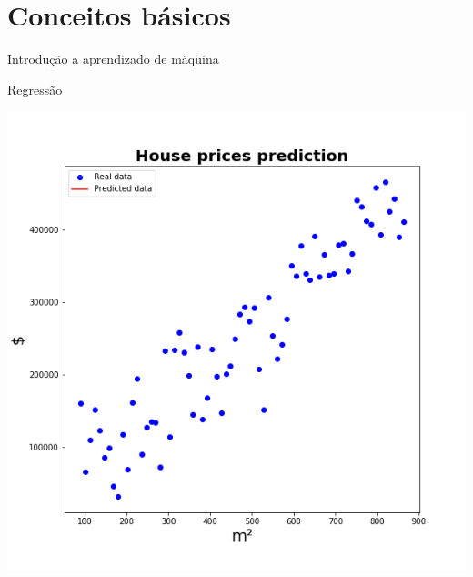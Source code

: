 \documentclass[10pt]{beamer}
\begin{document}
\nocite{DeepLearningbook}
\maketitle

\section{Conceitos básicos}

\begin{frame}{Introdução a aprendizado de máquina}

\end{frame}

\begin{frame}{Regressão}
\begin{center}
\includegraphics[scale=0.40]{images/house_prices1.png}
\end{center}
\end{frame}
\end{document}
